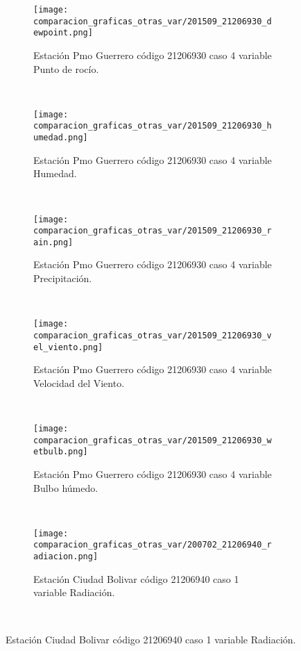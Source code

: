 \begin{figure}[H]
\centering
\begin{subfigure}[normla]{0.4\textwidth}
\caption{Estación Pmo Guerrero código 21206930 caso 4 variable Punto de rocío.}
\texttt{[image: comparacion\_graficas\_otras\_var/201509\_21206930\_dewpoint.png]}
\end{subfigure}
~
\begin{subfigure}[normla]{0.4\textwidth}
\caption{Estación Pmo Guerrero código 21206930 caso 4 variable Humedad.}
\texttt{[image: comparacion\_graficas\_otras\_var/201509\_21206930\_humedad.png]}
\end{subfigure}
~
\begin{subfigure}[normla]{0.4\textwidth}
\caption{Estación Pmo Guerrero código 21206930 caso 4 variable Precipitación.}
\texttt{[image: comparacion\_graficas\_otras\_var/201509\_21206930\_rain.png]}
\end{subfigure}
~
\begin{subfigure}[normla]{0.4\textwidth}
\caption{Estación Pmo Guerrero código 21206930 caso 4 variable Velocidad del Viento.}
\texttt{[image: comparacion\_graficas\_otras\_var/201509\_21206930\_vel\_viento.png]}
\end{subfigure}
~
\begin{subfigure}[normla]{0.4\textwidth}
\caption{Estación Pmo Guerrero código 21206930 caso 4 variable Bulbo húmedo.}
\texttt{[image: comparacion\_graficas\_otras\_var/201509\_21206930\_wetbulb.png]}
\end{subfigure}
~
\begin{subfigure}[normla]{0.4\textwidth}
\caption{Estación Ciudad Bolivar código 21206940 caso 1 variable Radiación.}
\texttt{[image: comparacion\_graficas\_otras\_var/200702\_21206940\_radiacion.png]}
\end{subfigure}
~
\end{figure}
           

